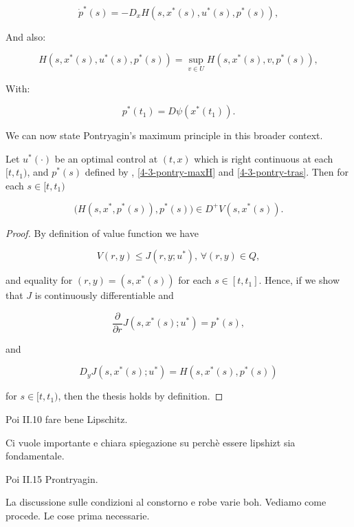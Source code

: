 \begin{equation}\label{4-3-pontrydotp}
    \dot{p}^{\ast}(s) =  - D_x H(s,x^{\ast}(s),u^{\ast}(s),p^{\ast}(s)),
\end{equation}

And also:

\begin{equation}\label{4-3-pontry-maxH}
    H(s,x^{\ast}(s),u^{\ast}(s),p^{\ast}(s)) = \sup_{v\in U} H(s,x^{\ast}(s),v,p^{\ast}(s)),
\end{equation}

With:

\begin{equation}\label{4-3-pontryp}
    p^{\ast}(t_1) = D \psi(x^{\ast}(t_1)).
\end{equation}

We can now state Pontryagin's maximum principle in this broader context.

\begin{theorem}
    Let $u^{\ast}(\cdot)$ be an optimal control at $(t,x)$ which is right continuous at each $[t,t_1)$, and $p^{\ast}(s)$ defined by \label{4-3-pontrydotp}, \ref{4-3-pontry-maxH} and \ref{4-3-pontry-tras}. 
    Then for each $s\in[t,t_1)$ 
    
    \begin{equation}
        \bigg(H(s,x^{\ast},p^{\ast}(s)),p^{\ast}(s)\bigg) \in D^+V(s,x^{\ast}(s)).
    \end{equation}

    \begin{proof}
        By definition of value function we have

        \[V(r,y) \leq J(r,y;u^{\ast}),\,\forall (r,y)\in Q,\]

        and equality for $(r,y)=(s,x^{\ast}(s))$ for each $s\in[t,t_1]$. Hence, if we show that $J$ is continuously differentiable and

        \begin{equation}
            \frac{\partial}{\partial r}J(s,x^{\ast}(s);u^{\ast}) = p^{\ast}(s),
        \end{equation}

        and 

        \begin{equation}
            D_yJ(s,x^{\ast}(s);u^{\ast}) = H(s,x^{\ast}(s),p^{\ast}(s))
        \end{equation}

        for $s\in[t,t_1)$, then the thesis holds by definition. 
    \end{proof}
\end{theorem}






Poi II.10 fare bene Lipschitz.

Ci vuole importante e chiara spiegazione su perchè essere lipshizt sia fondamentale.

Poi II.15 Prontryagin.

La discussione sulle condizioni al constorno e robe varie boh. Vediamo come procede. Le cose prima necessarie.  